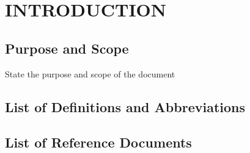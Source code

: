 \section{INTRODUCTION}
\subsection{Purpose and Scope} State the purpose and scope of the document
\subsection{List of Definitions and Abbreviations} 
\subsection{List of Reference Documents}


